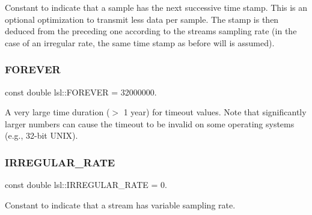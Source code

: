 Constant to indicate that a sample has the next successive time stamp. This is an optional optimization to transmit less data per sample. The stamp is then deduced from the preceding one according to the stream\textquotesingle{}s sampling rate (in the case of an irregular rate, the same time stamp as before will is assumed). \mbox{\label{namespacelsl_a74cfbc9077aca21295117217249721ed}} 
\subsubsection{\texorpdfstring{F\+O\+R\+E\+V\+ER}{FOREVER}}
{\footnotesize\ttfamily const double lsl\+::\+F\+O\+R\+E\+V\+ER = 32000000.}

A very large time duration ($>$ 1 year) for timeout values. Note that significantly larger numbers can cause the timeout to be invalid on some operating systems (e.\+g., 32-\/bit U\+N\+IX). \mbox{\label{namespacelsl_ac7ebddefe1091ef2d9459b6f9d79f7ab}} 
\subsubsection{\texorpdfstring{I\+R\+R\+E\+G\+U\+L\+A\+R\+\_\+\+R\+A\+TE}{IRREGULAR\_RATE}}
{\footnotesize\ttfamily const double lsl\+::\+I\+R\+R\+E\+G\+U\+L\+A\+R\+\_\+\+R\+A\+TE = 0.}

Constant to indicate that a stream has variable sampling rate. 